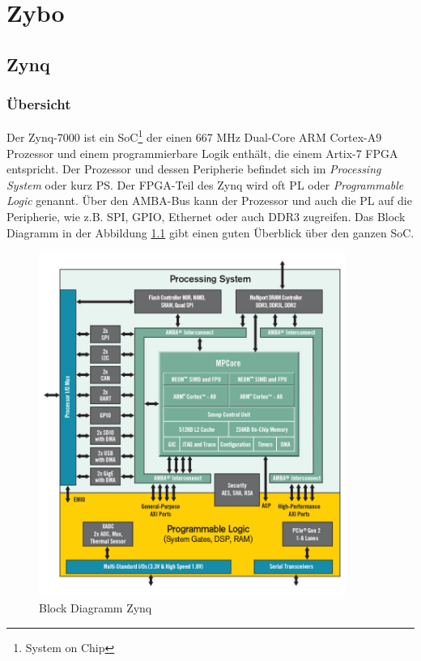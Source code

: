 \chapter{Zybo}

\section{Zynq}
\subsection{Übersicht}
Der Zynq-7000 ist ein SoC\footnote{System on Chip} der einen 667 MHz Dual-Core ARM Cortex-A9 Prozessor und einem programmierbare Logik enthält, die einem Artix-7 FPGA entspricht.
Der Prozessor und dessen Peripherie befindet sich im \textit{Processing System} oder kurz PS.
Der FPGA-Teil des Zynq wird oft PL oder \textit{Programmable Logic} genannt.
Über den AMBA-Bus kann der Prozessor und auch die PL auf die Peripherie, wie z.B. SPI, GPIO, Ethernet oder auch DDR3 zugreifen.
Das Block Diagramm in der Abbildung \ref{fig:BlockDiagrammZynq} gibt einen guten Überblick über den ganzen SoC.

\begin{figure}[htbp]
	\centering
		\includegraphics[width=10cm,height=\textheight,keepaspectratio]{images/zynqBlockDiagram.png}
	\caption[Block Diagramm Zynq]{Block Diagramm Zynq\footnotemark}
	\label{fig:BlockDiagrammZynq}
\end{figure}


